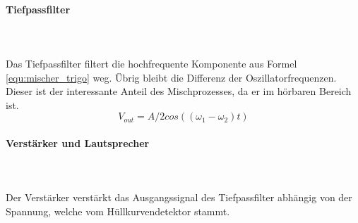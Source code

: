 \paragraph{Tiefpassfilter}\mbox{}\\ 
\\Das Tiefpassfilter filtert die hochfrequente Komponente aus Formel \ref{equ:mischer_trigo} weg. Übrig bleibt die Differenz der Oszillatorfrequenzen. Dieser ist der interessante Anteil des Mischprozesses, da er im hörbaren Bereich ist.
\begin{equation}
V_{out} = A/2cos((\omega_{1}-\omega_{2})t) 
\label{equ:mischer_gefilt}
\end{equation}

\paragraph{Verstärker und  Lautsprecher}\mbox{}\\ 
\\Der Verstärker verstärkt das Ausgangssignal des Tiefpassfilter abhängig von der Spannung, welche vom Hüllkurvendetektor stammt.
